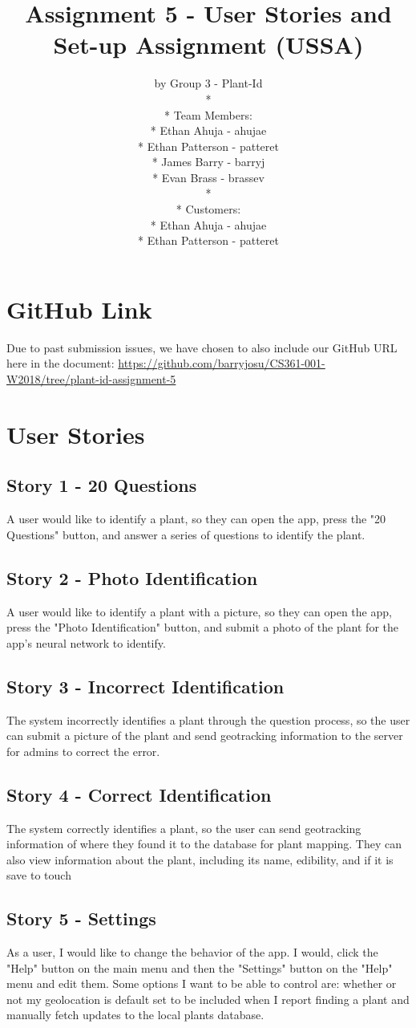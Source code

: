 \documentclass[a4paper]{article}
\title{Assignment 5 - User Stories and Set-up Assignment (USSA)}
\author{ by Group 3 - Plant-Id \\* \\* Team Members: \\* Ethan Ahuja - ahujae \\* Ethan Patterson - patteret \\* James Barry - barryj \\* Evan Brass - brassev \\* \\* Customers: \\* Ethan Ahuja - ahujae \\* Ethan Patterson - patteret}
\begin{document}
\maketitle
\pagebreak
\tableofcontents
\pagebreak
\section{GitHub Link}
Due to past submission issues, we have chosen to also include our GitHub URL here in the document: \url{https://github.com/barryjosu/CS361-001-W2018/tree/plant-id-assignment-5}
\section{User Stories}
\subsection{Story 1 - 20 Questions}
A user would like to identify a plant, so they can open the app, press the "20 Questions" button, and answer a series of questions to identify the plant.
\subsection{Story 2 - Photo Identification}
A user would like to identify a plant with a picture, so they can open the app, press the "Photo Identification" button, and submit a photo of the plant for the app's neural network to identify.
\subsection{Story 3 - Incorrect Identification}
The system incorrectly identifies a plant through the question process, so the user can submit a picture of the plant and send geotracking information to the server for admins to correct the error.
\subsection{Story 4 - Correct Identification}
The system correctly identifies a plant, so the user can send geotracking information of where they found it to the database for plant mapping. They can also view information about the plant, including its name, edibility, and if it is save to touch
\subsection{Story 5 - Settings}
As a user, I would like to change the behavior of the app.  I would, click the "Help" button on the main menu and then the "Settings" button on the "Help" menu and edit them. Some options I want to be able to control are: whether or not my geolocation is default set to be included when I report finding a plant and manually fetch updates to the local plants database.
\end{document}

